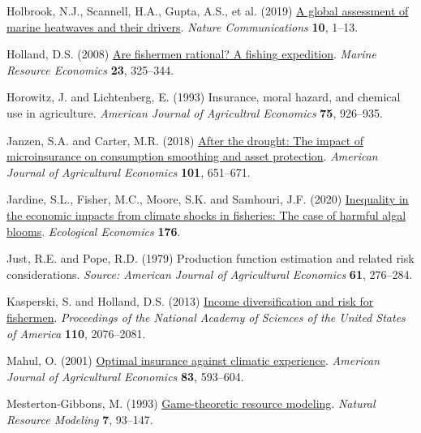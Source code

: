 \documentclass[
  letterpaper,
  DIV=11,
  numbers=noendperiod]{scrartcl}
\newlength{\cslhangindent}
\newlength{\cslentryspacingunit} %
\newenvironment{CSLReferences}[2] %
 {%
  \setlength{\parindent}{0pt}
  \ifodd #1
  \let\oldpar\par
  \def\par{\hangindent=\cslhangindent\oldpar}
  \fi
  \setlength{\parskip}{#2\cslentryspacingunit}
 }%
 {}
\theoremstyle{plain}
\theoremstyle{plain}
\theoremstyle{remark}
\begin{document}
\begin{CSLReferences}{1}{0}
\leavevmode{}%
Holbrook, N.J., Scannell, H.A., Gupta, A.S., et al. (2019)
\href{https://doi.org/10.1038/s41467-019-10206-z}{A global assessment of
marine heatwaves and their drivers}. \emph{Nature Communications}
\textbf{10}, 1--13.

\leavevmode{}%
Holland, D.S. (2008)
\href{https://doi.org/10.1086/mre.23.3.42629621}{Are fishermen rational?
A fishing expedition}. \emph{Marine Resource Economics} \textbf{23},
325--344.

\leavevmode{}%
Horowitz, J. and Lichtenberg, E. (1993) Insurance, moral hazard, and
chemical use in agriculture. \emph{American Journal of Agricultral
Economics} \textbf{75}, 926--935.

\leavevmode{}%
Janzen, S.A. and Carter, M.R. (2018)
\href{https://doi.org/10.1093/ajae/aay061}{After the drought: The impact
of microinsurance on consumption smoothing and asset protection}.
\emph{American Journal of Agricultural Economics} \textbf{101},
651--671.

\leavevmode{}%
Jardine, S.L., Fisher, M.C., Moore, S.K. and Samhouri, J.F. (2020)
\href{https://doi.org/10.1016/j.ecolecon.2020.106691}{Inequality in the
economic impacts from climate shocks in fisheries: The case of harmful
algal blooms}. \emph{Ecological Economics} \textbf{176}.

\leavevmode{}%
Just, R.E. and Pope, R.D. (1979) Production function estimation and
related risk considerations. \emph{Source: American Journal of
Agricultural Economics} \textbf{61}, 276--284.

\leavevmode{}%
Kasperski, S. and Holland, D.S. (2013)
\href{https://doi.org/10.1073/pnas.1212278110}{Income diversification
and risk for fishermen}. \emph{Proceedings of the National Academy of
Sciences of the United States of America} \textbf{110}, 2076--2081.

\leavevmode{}%
Mahul, O. (2001) \href{https://doi.org/10.1111/0002-9092.00180}{Optimal
insurance against climatic experience}. \emph{American Journal of
Agricultural Economics} \textbf{83}, 593--604.

\leavevmode{}%
Mesterton-Gibbons, M. (1993)
\href{https://doi.org/10.1111/j.1939-7445.1993.tb00143.x}{Game-theoretic
resource modeling}. \emph{Natural Resource Modeling} \textbf{7},
93--147.


\end{CSLReferences}
\end{document}
